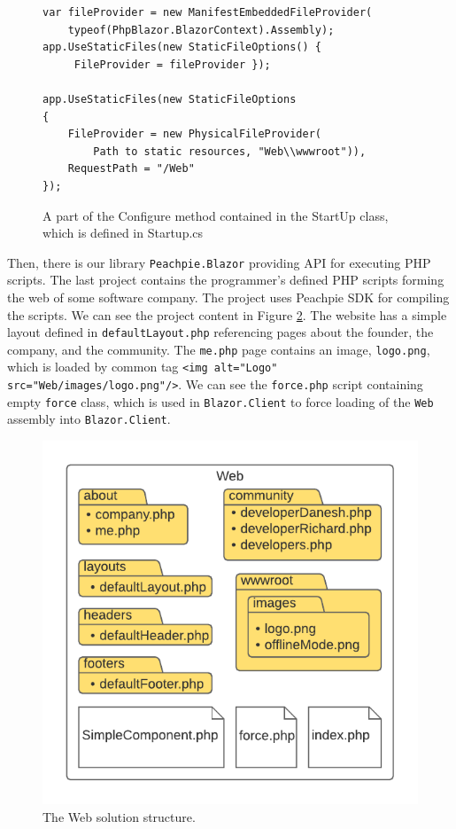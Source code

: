 \begin{figure}[H]
\begin{lstlisting}
var fileProvider = new ManifestEmbeddedFileProvider(
	typeof(PhpBlazor.BlazorContext).Assembly);
app.UseStaticFiles(new StaticFileOptions() {
	 FileProvider = fileProvider });

app.UseStaticFiles(new StaticFileOptions
{
	FileProvider = new PhysicalFileProvider(
		Path to static resources, "Web\\wwwroot")),
	RequestPath = "/Web"
});
\end{lstlisting}
\caption{A part of the Configure method contained in the StartUp class, which is defined in Startup.cs}
\label{img21:server}
\end{figure}
\par
Then, there is our library \texttt{Peachpie.Blazor} providing API for executing PHP scripts.
The last project contains the programmer's defined PHP scripts forming the web of some software company.
The project uses Peachpie \ac{SDK} for compiling the scripts.
We can see the project content in Figure \ref{img22:web}.
The website has a simple layout defined in \texttt{defaultLayout.php} referencing pages about the founder, the company, and the community.
The \texttt{me.php} page contains an image, \texttt{logo.png}, which is loaded by common tag \texttt{<img alt="Logo" src="Web/images/logo.png"/>}.
We can see the \texttt{force.php} script containing empty \texttt{force} class, which is used in \texttt{Blazor.Client} to force loading of the \texttt{Web} assembly into \texttt{Blazor.Client}.
\par
\begin{figure}[H]\centering
\includegraphics[scale=0.9]{./img/WebStructure}
\caption{The Web solution structure.}
\label{img22:web}
\end{figure} 
